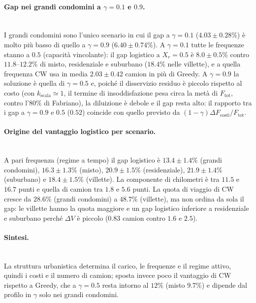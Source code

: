 \paragraph{Gap nei grandi condomini a $\gamma=0.1$ e $0.9$.}\mbox{}\\
I grandi condomini sono l'unico scenario in cui il gap a $\gamma=0.1$ ($4.03\pm0.28\%$) è molto più basso di quello a $\gamma=0.9$ ($6.40\pm0.74\%$). A $\gamma=0.1$ tutte le frequenze stanno a $0.5$ (capacità vincolante): il gap logistico a $X_r=0.5$ è $8.0\pm0.5\%$ contro $11.8$--$12.2\%$ di misto, residenziale e suburbano ($18.4\%$ nelle villette), e a quella frequenza CW usa in media $2.03\pm0.42$ camion in più di Greedy. A $\gamma=0.9$ la soluzione è quella di $\gamma=0.5$ e, poiché il disservizio residuo è piccolo rispetto al costo (con $k_{\mathrm{scala}}\simeq1$, il termine di insoddisfazione pesa circa la metà di $F_{\mathrm{tot}}$, contro l'$80\%$ di Fabriano), la diluizione è debole e il gap resta alto: il rapporto tra i gap a $\gamma=0.9$ e $0.5$ ($0.52$) coincide con quello previsto da $(1-\gamma)\Delta F_{\mathrm{costi}}/F_{\mathrm{tot}}$.

\paragraph{Origine del vantaggio logistico per scenario.}\mbox{}\\
A pari frequenza (regime a tempo) il gap logistico è $13.4\pm1.4\%$ (grandi condomini), $16.3\pm1.3\%$ (misto), $20.9\pm1.5\%$ (residenziale), $21.9\pm1.4\%$ (suburbano) e $18.4\pm1.5\%$ (villette). La componente di chilometri è tra $11.5$ e $16.7$ punti e quella di camion tra $1.8$ e $5.6$ punti. La quota di viaggio di CW cresce da $28.6\%$ (grandi condomini) a $48.7\%$ (villette), ma non ordina da sola il gap: le villette hanno la quota maggiore e un gap logistico inferiore a residenziale e suburbano perché $\Delta V$ è piccolo ($0.83$ camion contro $1.6$ e $2.5$).

\paragraph{Sintesi.}\mbox{}\\
La struttura urbanistica determina il carico, le frequenze e il regime attivo, quindi i costi e il numero di camion; sposta invece poco il vantaggio di CW rispetto a Greedy, che a $\gamma=0.5$ resta intorno al $12\%$ (misto $9.7\%$) e dipende dal profilo in $\gamma$ solo nei grandi condomini.




